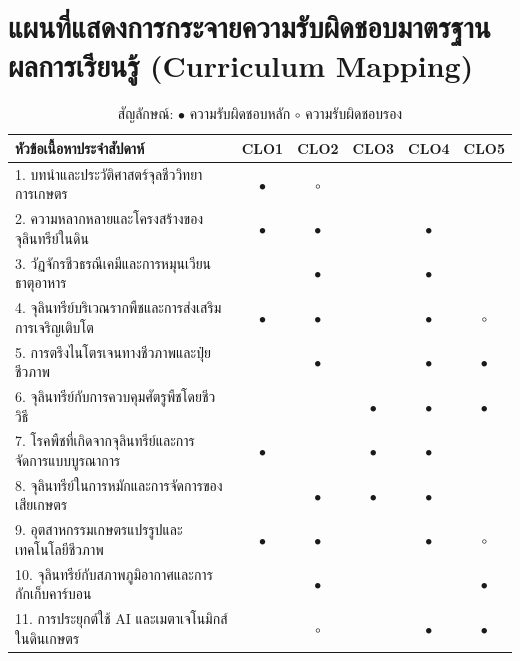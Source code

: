 \section*{แผนที่แสดงการกระจายความรับผิดชอบมาตรฐานผลการเรียนรู้ (Curriculum Mapping)}
\begin{table}[H]
\centering
\small
\begin{tabularx}{\textwidth}{|X|c|c|c|c|c|}
\hline
\rowcolor{agriMint}
\textbf{หัวข้อเนื้อหาประจำสัปดาห์} & \textbf{CLO1} & \textbf{CLO2} & \textbf{CLO3} & \textbf{CLO4} & \textbf{CLO5} \\ \hline
1. บทนำและประวัติศาสตร์จุลชีววิทยาการเกษตร & $\bullet$ & $\circ$ & & & \\ \hline
2. ความหลากหลายและโครงสร้างของจุลินทรีย์ในดิน & $\bullet$ & $\bullet$ & & $\bullet$ & \\ \hline
3. วัฏจักรชีวธรณีเคมีและการหมุนเวียนธาตุอาหาร & & $\bullet$ & & $\bullet$ & \\ \hline
4. จุลินทรีย์บริเวณรากพืชและการส่งเสริมการเจริญเติบโต & $\bullet$ & $\bullet$ & & $\bullet$ & $\circ$ \\ \hline
5. การตรึงไนโตรเจนทางชีวภาพและปุ๋ยชีวภาพ & & $\bullet$ & & $\bullet$ & $\bullet$ \\ \hline
6. จุลินทรีย์กับการควบคุมศัตรูพืชโดยชีววิธี & & & $\bullet$ & $\bullet$ & $\bullet$ \\ \hline
7. โรคพืชที่เกิดจากจุลินทรีย์และการจัดการแบบบูรณาการ & $\bullet$ & & $\bullet$ & $\bullet$ & \\ \hline
8. จุลินทรีย์ในการหมักและการจัดการของเสียเกษตร & & $\bullet$ & $\bullet$ & $\bullet$ & \\ \hline
9. อุตสาหกรรมเกษตรแปรรูปและเทคโนโลยีชีวภาพ & $\bullet$ & $\bullet$ & & $\bullet$ & $\circ$ \\ \hline
10. จุลินทรีย์กับสภาพภูมิอากาศและการกักเก็บคาร์บอน & & $\bullet$ & & & $\bullet$ \\ \hline
11. การประยุกต์ใช้ AI และเมตาเจโนมิกส์ในดินเกษตร & & $\circ$ & & $\bullet$ & $\bullet$ \\ \hline
\end{tabularx}
\caption*{สัญลักษณ์: $\bullet$ ความรับผิดชอบหลัก \quad $\circ$ ความรับผิดชอบรอง}
\end{table}

\clearpage
